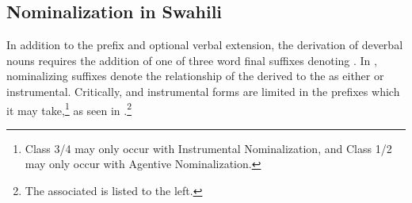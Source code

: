 \documentclass[output=paper,modfonts]{langscibook}
\begin{document}
\subsection{Nominalization in Swahili}\label{sec:kloehn:1.2}

In addition to the  prefix and optional verbal extension, the derivation of deverbal nouns requires the addition of one of three word final suffixes denoting  \citep{Katamba2003}. In , nominalizing suffixes denote the relationship of the derived  to the  as either  or instrumental. Critically,  and instrumental forms are limited in the  prefixes which it may take,{}\footnote{Class 3/4 may only occur with Instrumental Nominalization, and Class 1/2 may only occur with Agentive Nominalization.} as seen in .{}\footnote{The associated  is listed to the left.}
\end{document}

